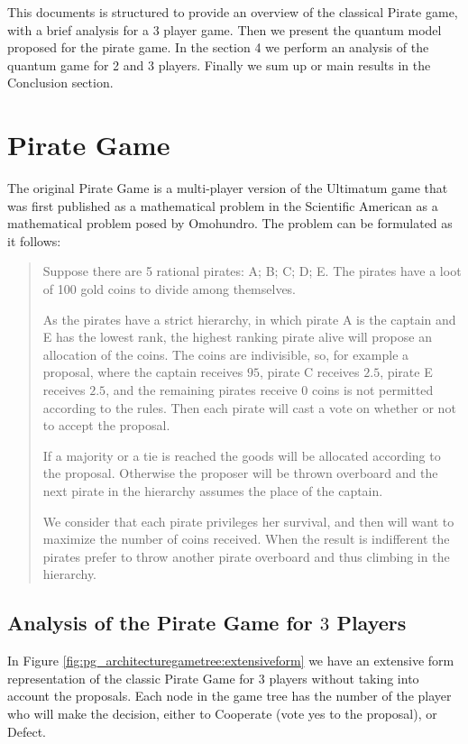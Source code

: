 \documentclass[10pt]{llncs}
\begin{document}
This documents is structured to provide an overview of the classical Pirate game, with a brief analysis for a $3$ player game. Then we present the quantum model proposed for the pirate game. In the section 4 we perform an analysis of the quantum game for 2 and 3 players. Finally we sum up or main results in the Conclusion section. 


\section{Pirate Game}
\label{sec:pirate_description}

The original Pirate Game is a multi-player version of the Ultimatum game that was first published as a mathematical problem in the Scientific American as a mathematical problem posed by Omohundro\cite{Stewart1999}. The problem can be formulated as it follows:

\begin{quotation}
Suppose there are 5 rational pirates: A; B; C; D; E. The pirates have a  loot of 100 gold coins to divide among themselves.

As the pirates have a strict hierarchy, in which pirate A is the captain and E has the lowest rank, the highest ranking pirate alive will propose an allocation of the coins. The coins are indivisible, so, for example a proposal, where the captain receives $95$, pirate C receives $2.5$, pirate E receives $2.5$, and the remaining pirates receive $0$ coins is not permitted according to the rules.  Then each pirate will cast a vote on whether or not to accept the proposal. 

If a majority or a tie is reached the goods will be allocated according to the proposal. Otherwise the proposer will be thrown overboard and the next pirate in the hierarchy assumes the place of the captain. 

We consider that each pirate privileges her survival, and then will want to maximize the number of coins received. When the result is indifferent the pirates prefer to throw another pirate overboard and thus climbing in the hierarchy. 
\end{quotation}

\subsection{Analysis of the Pirate Game for $3$ Players}
\label{subsubsec:analysis_PG3players}

In Figure \ref{fig:pg_architecturegametree:extensiveform} we have an extensive form representation of the classic Pirate Game for $3$ players without taking into account the proposals. Each node in the game tree has the number of the player who will make the decision, either to Cooperate (vote yes to the proposal), or Defect. 
\end{document}
